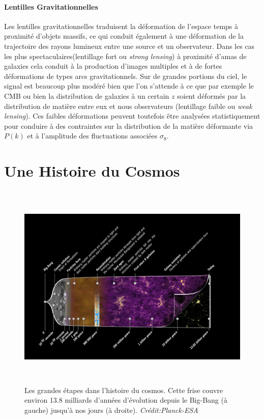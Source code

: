 \paragraph{Lentilles Gravitationnelles}
Les lentilles gravitationnelles traduisent la déformation de l'espace temps à proximité d'objets massifs, ce qui conduit également à une déformation de la trajectoire des rayons lumineux entre une source et un observateur. Dans les cas les plus spectaculaires(lentillage fort ou \textit{strong lensing}) à proximité d'amas de galaxies  cela conduit à la production d'images multiples et à de fortes déformations de types arcs gravitationnels. Sur de grandes portions du ciel, le signal est beaucoup plus modéré bien que l'on s'attende à ce que par exemple le CMB ou bien la distribution de galaxies à un certain $z$ soient déformés par la distribution de matière entre eux et nous observateurs (lentillage faible ou \textit{weak lensing}). Ces faibles déformations peuvent toutefois être analysées statistiquement pour conduire à des contraintes sur la distribution de la matière déformante via $P(k)$ et à l'amplitude des fluctuations associées $\sigma_8$.

\section{Une Histoire du Cosmos}
\begin{figure}[htbp]
	\centering
		\includegraphics[height=10cm]{figs/timeline.png}
		\caption[Les grandes étapes dans l'histoire du cosmos]{Les grandes étapes dans l'histoire du cosmos. Cette frise couvre environ 13.8 milliards d'années d'évolution depuis le Big-Bang (à gauche) jusqu'à nos jours (à droite). \textit{Crédit:Planck-ESA}}
	\label{f:timeline}
\end{figure}

